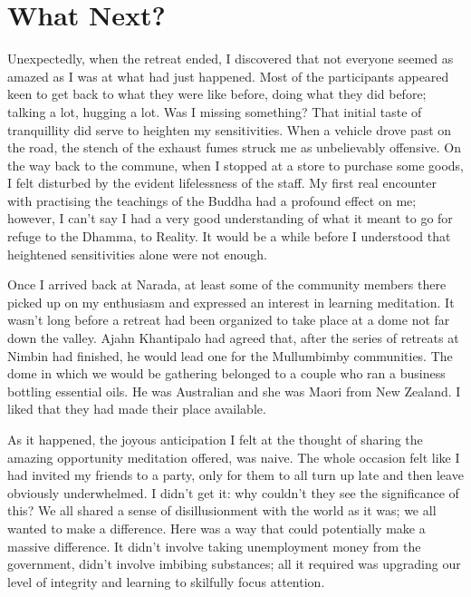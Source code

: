\chapter{What Next?}

Unexpectedly, when the retreat ended, I discovered that not everyone
seemed as amazed as I was at what had just happened. Most of the participants
appeared keen to get back to what they were like before, doing what they
did before; talking a lot, hugging a lot. Was I missing something? That
initial taste of tranquillity did serve to heighten my sensitivities.
When a vehicle drove past on the road, the stench of the exhaust fumes
struck me as unbelievably offensive. On the way back to the commune,
when I stopped at a store to purchase some goods, I felt disturbed by
the evident lifelessness of the staff. My first real encounter with
practising the teachings of the Buddha had a profound effect on me;
however, I can't say I had a very good understanding of what it meant to
go for refuge to the Dhamma, to Reality. It would be a while before I
understood that heightened sensitivities alone were not enough.

Once I arrived back at Narada, at least some of the community members
there picked up on my enthusiasm and expressed an interest in learning
meditation. It wasn't long before a retreat had been organized to take
place at a dome not far down the valley. Ajahn Khantipalo had agreed
that, after the series of retreats at Nimbin had finished, he would lead
one for the Mullumbimby communities. The dome in which we would be
gathering belonged to a couple who ran a business bottling essential
oils. He was Australian and she was Maori from New Zealand. I liked that
they had made their place available.

As it happened, the joyous anticipation I felt at the thought of sharing
the amazing opportunity meditation offered, was naive. The whole
occasion felt like I had invited my friends to a party, only for them to
all turn up late and then leave obviously underwhelmed. I didn't get it:
why couldn't they see the significance of this? We all shared a sense of
disillusionment with the world as it was; we all wanted to make a
difference. Here was a way that could potentially make a massive
difference. It didn't involve taking unemployment money from the
government, didn't involve imbibing substances; all it required was
upgrading our level of integrity and learning to skilfully focus
attention.

